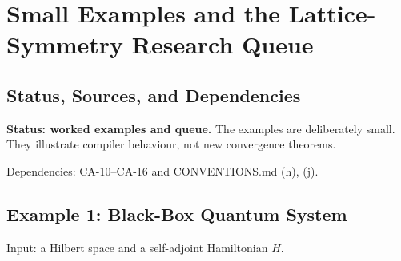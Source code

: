 
\section{Small Examples and the Lattice-Symmetry Research Queue}
\label{sec:lattice-symmetry-examples-queue}

\subsection{Status, Sources, and Dependencies}

\textbf{Status: worked examples and queue.}  The examples are deliberately
small.  They illustrate compiler behaviour, not new convergence theorems.

Dependencies: CA-10--CA-16 and CONVENTIONS.md (h), (j).


\subsection{Example 1: Black-Box Quantum System}

Input: a Hilbert space and a self-adjoint Hamiltonian \(H\).

